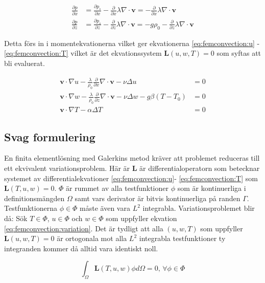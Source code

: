 \begin{align}
\label{eq:femconvection:partx}
\frac{\partial p}{\partial x} &= \frac{\partial p_s}{\partial x} -
\frac{\partial}{\partial x} \lambda\nabla\cdot\mathbf{v} = -
\frac{\partial}{\partial x} \lambda\nabla\cdot\mathbf{v}
\\
\label{eq:femconvection:partz}
\frac{\partial p}{\partial z} &= \frac{\partial p_s}{\partial z} -
\frac{\partial}{\partial z} \lambda\nabla\cdot\mathbf{v} =
-g\rho_0 - \frac{\partial}{\partial z} \lambda\nabla\cdot\mathbf{v}
\end{align}

\noindent
Detta förs in i momentekvationerna vilket ger ekvationerna \eqref{eq:femconvection:u} -
\eqref{eq:femconvection:T} vilket är det ekvationssystem $\mathbf{L}(u,w,T) = 0$
som syftas att bli evaluerat.

\begin{align}
\label{eq:femconvection:u}
\mathbf{v}\cdot\nabla u -
\frac{\lambda}{\rho_0}\frac{\partial}{\partial x}\nabla\cdot\mathbf{v} -\nu\Delta u &= 0
\\
\label{eq:femconvection:w}
\mathbf{v}\cdot\nabla w -
\frac{\lambda}{\rho_0}\frac{\partial}{\partial z}\nabla\cdot\mathbf{v}
- \nu\Delta w - g\beta(T-T_0) &= 0 \\ 
\label{eq:femconvection:T}
\mathbf{v}\cdot\nabla T - \alpha\Delta T &= 0
\end{align}

\subsection{Svag formulering}

En finita elementlösning med Galerkins metod kräver att problemet reduceras till
ett ekvivalent variationsproblem. 
Här är $\mathbf{L}$ är differentialoperatorn
som betecknar systemet av differentialekvationer \eqref{eq:femconvection:u}-
\eqref{eq:femconvection:T} som $\mathbf{L}(T,u,w) = 0$.
$\Phi$ är rummet av alla testfunktioner $\phi$ som är kontinuerliga i
definitionsmängden $\Omega$ samt vars derivator är bitvis kontinuerliga på randen
$\Gamma$. Testfunktionerna $\phi \in \Phi$ måste även vara $L^2$ integrabla.
Variationsproblemet blir då: Sök $T\in\Phi$, $u\in\Phi$ och
$w\in\Phi$ som uppfyller ekvation \eqref{eq:femconvection:variation}. Det är tydligt
att alla $(u,w,T)$ som uppfyller $\mathbf{L}(u,w,T) = 0$ är ortogonala mot alla
$L^2$ integrabla testfunktioner ty integranden kommer då alltid vara identiskt noll.

\begin{equation}
\label{eq:femconvection:variation}
\int_\Omega \mathbf{L}(T,u,w) \phi d\Omega = 0\mbox{,  } \forall \phi \in \Phi
\end{equation}

